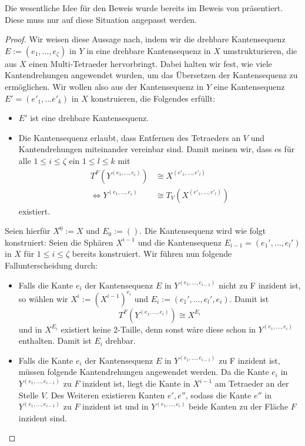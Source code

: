 \documentclass[12pt,titlepage,twoside,cleardoublepage]{article}
\theoremstyle{nummermitklammern}
\numberwithin{equation}{section}
\begin{document}
Die wesentliche Idee für den Beweis wurde bereits im Beweis von  präsentiert. Diese muss nur auf diese Situation angepasst werden.
\begin{proof}
Wir weisen diese Aussage nach, indem wir die drehbare Kantensequenz $E:=(e_1,\ldots , e_{\zeta})$
in $Y$ in eine drehbare Kantensequenz in $X$ umstrukturieren, die aus $X$ einen
Multi-Tetraeder hervorbringt. Dabei halten wir fest, wie viele Kantendrehungen angewendet wurden, um das Übersetzen der Kantensequenz zu ermöglichen.
Wir wollen also aus der Kantensequenz in $Y$ eine Kantensequenz $E'=(e'_1,\ldots e'_k)$ in $X$ konstruieren, die Folgendes erfüllt:
\begin{itemize}
\item $E'$ ist eine drehbare Kantensequenz.
\item Die Kantensequenz erlaubt, dass Entfernen des Tetraeders an  $V$ und Kantendrehungen miteinander vereinbar sind. Damit meinen wir, dass es für alle $1\leq i\leq \zeta$ ein $1\leq l \leq k$ mit 
\begin{align*}
T^F(Y^{(e_1,\ldots, e_i)})&\cong X^{(e'_1,\ldots,e'_l)} \\
\Leftrightarrow Y^{(e_1,\ldots, e_i)}&\cong T_V(X^{(e'_1,\ldots,e'_l)})
\end{align*} 
existiert.
\end{itemize}
Seien  hierfür $X^0:=X$ und $E_0:=().$ Die Kantensequenz wird wie folgt konstruiert: Seien die Sphären $X^{i-1}$ und die Kantensequenz $E_{i-1}=(e_1',\ldots,e_l')$ in $X$ für $1\leq i \leq \zeta$ bereits konstruiert. Wir führen nun folgende Fallunterscheidung durch:
\begin{itemize}
\item Falls die Kante $e_{i}$ der Kantensequenz $E$ in $Y^{(e_1,\ldots,e_{i-1})}$ nicht zu F inzident ist, so wählen wir $X^{i}:={(X^{i-1})}^{e_i}$ und $E_{i}:=(e_1',\ldots,e_l',e_i)$. Damit ist 
\[
T^F(Y^{(e_1,\ldots,e_i)})\cong X^{E_{i}}
\]
und in $X^{E_{i}}$ existiert keine 2-Taille, denn sonst wäre diese schon in $Y^{(e_1,\ldots,e_i)}$ enthalten. Damit ist $E_{i}$ drehbar.
\item Falls die Kante $e_i$ der Kantensequenz $E$ in $Y^{(e_1,\ldots,e_{i-1})}$ zu F inzident ist, müssen folgende Kantendrehungen angewendet werden. Da die Kante $e_i$ in $Y^{(e_1,\ldots,e_{i-1})}$ zu $F$ inzident ist, liegt die Kante in $X^{i-1}$ am Tetraeder an der Stelle $V.$
Des Weiteren existieren Kanten $e',e''$, sodass die Kante $e''$ in $Y^{(e_1,\ldots,e_{i-1})}$ zu $F$ inzident ist und in $Y^{(e_1,\ldots,e_{i})}$ beide Kanten zu der Fläche $F$ inzident sind.

\end{itemize}
\end{proof}
\end{document}
